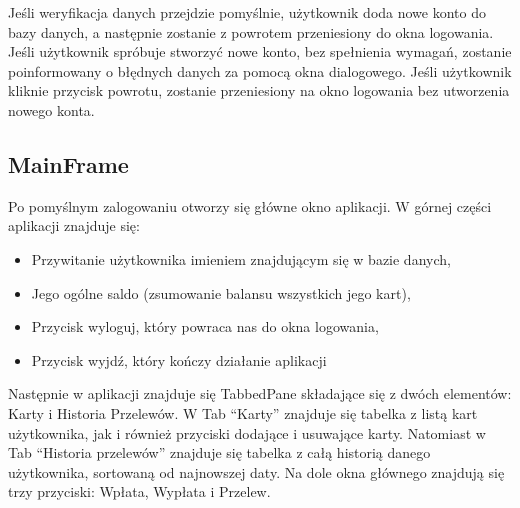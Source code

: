 \documentclass[12pt, letterpaper]{article}
\begin{document}
\quad Jeśli weryfikacja danych przejdzie pomyślnie, użytkownik doda nowe konto do bazy danych, a następnie zostanie z powrotem przeniesiony do okna logowania.
Jeśli użytkownik spróbuje stworzyć nowe konto, bez spełnienia wymagań, zostanie poinformowany o błędnych danych za pomocą okna dialogowego.
Jeśli użytkownik kliknie przycisk powrotu, zostanie przeniesiony na okno logowania bez utworzenia nowego konta.

\newpage

\subsection{MainFrame}

\quad Po pomyślnym zalogowaniu otworzy się główne okno aplikacji. 
W górnej części aplikacji znajduje się: 

\begin{itemize}
\item Przywitanie użytkownika imieniem znajdującym się w bazie danych,
\item Jego ogólne saldo (zsumowanie balansu wszystkich jego kart),
\item Przycisk wyloguj, który powraca nas do okna logowania,
\item Przycisk wyjdź, który kończy działanie aplikacji
\end{itemize}

\quad Następnie w aplikacji znajduje się TabbedPane składające się z dwóch elementów: Karty i Historia Przelewów.
W Tab “Karty” znajduje się tabelka z listą kart użytkownika, jak i również przyciski dodające i usuwające karty.
Natomiast w Tab “Historia przelewów” znajduje się tabelka z całą historią danego użytkownika, sortowaną od najnowszej daty.
Na dole okna głównego znajdują się trzy przyciski: Wpłata, Wypłata i Przelew.
\end{document}
